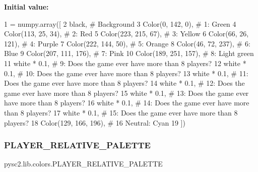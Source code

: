 {\bfseries Initial value\+:}
\begin{DoxyCode}
1 =  numpy.array([
2     black,                 \textcolor{comment}{# Background}
3     Color(0, 142, 0),      \textcolor{comment}{# 1: Green}
4     Color(113, 25, 34),    \textcolor{comment}{# 2: Red}
5     Color(223, 215, 67),   \textcolor{comment}{# 3: Yellow}
6     Color(66, 26, 121),    \textcolor{comment}{# 4: Purple}
7     Color(222, 144, 50),   \textcolor{comment}{# 5: Orange}
8     Color(46, 72, 237),    \textcolor{comment}{# 6: Blue}
9     Color(207, 111, 176),  \textcolor{comment}{# 7: Pink}
10     Color(189, 251, 157),  \textcolor{comment}{# 8: Light green}
11     white * 0.1,           \textcolor{comment}{# 9: Does the game ever have more than 8 players?}
12     white * 0.1,           \textcolor{comment}{# 10: Does the game ever have more than 8 players?}
13     white * 0.1,           \textcolor{comment}{# 11: Does the game ever have more than 8 players?}
14     white * 0.1,           \textcolor{comment}{# 12: Does the game ever have more than 8 players?}
15     white * 0.1,           \textcolor{comment}{# 13: Does the game ever have more than 8 players?}
16     white * 0.1,           \textcolor{comment}{# 14: Does the game ever have more than 8 players?}
17     white * 0.1,           \textcolor{comment}{# 15: Does the game ever have more than 8 players?}
18     Color(129, 166, 196),  \textcolor{comment}{# 16 Neutral: Cyan}
19 ])
\end{DoxyCode}
\mbox{\label{namespacepysc2_1_1lib_1_1colors_ad26728a45e354e2342bdbca4b84b6561}} 
\subsubsection{\texorpdfstring{P\+L\+A\+Y\+E\+R\+\_\+\+R\+E\+L\+A\+T\+I\+V\+E\+\_\+\+P\+A\+L\+E\+T\+TE}{PLAYER\_RELATIVE\_PALETTE}}
{\footnotesize\ttfamily pysc2.\+lib.\+colors.\+P\+L\+A\+Y\+E\+R\+\_\+\+R\+E\+L\+A\+T\+I\+V\+E\+\_\+\+P\+A\+L\+E\+T\+TE}

